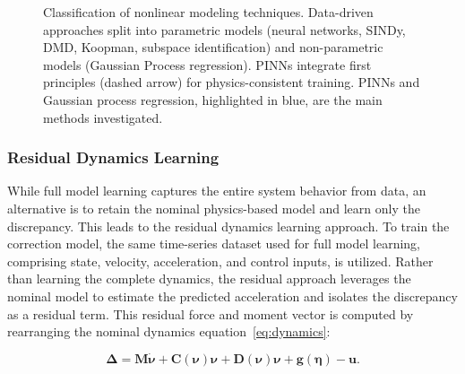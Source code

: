 \begin{figure}[htbp]
    \caption{
    Classification of nonlinear modeling techniques. Data-driven approaches split into parametric models (neural networks, SINDy, DMD, Koopman, subspace identification) and non-parametric models (Gaussian Process regression). PINNs integrate first principles (dashed arrow) for physics-consistent training. PINNs and Gaussian process regression, highlighted in blue, are the main methods investigated.
    }
    \label{fig:nonlinear_modeling_classification}
\end{figure}






































\subsubsection{Residual Dynamics Learning}
While full model learning captures the entire system behavior from data, an alternative is to retain the nominal physics-based model and learn only the discrepancy. This leads to the residual dynamics learning approach. To train the correction model, the same time-series dataset used for full model learning, comprising state, velocity, acceleration, and control inputs, is utilized. Rather than learning the complete dynamics, the residual approach leverages the nominal model to estimate the predicted acceleration and isolates the discrepancy as a residual term. This residual force and moment vector is computed by rearranging the nominal dynamics equation~\eqref{eq:dynamics}:

\begin{equation}
    \boldsymbol{\Delta }= \mathbf{M} \dot{\boldsymbol{\nu}} + \mathbf{C}(\boldsymbol{\nu}) \boldsymbol{\nu} + \mathbf{D}(\boldsymbol{\nu}) \boldsymbol{\nu} + \mathbf{g}(\boldsymbol{\eta}) - \mathbf{u}.
\end{equation}

